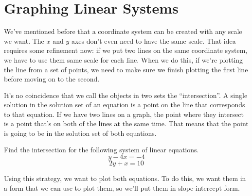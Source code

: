 
\section{Graphing Linear Systems}

We've mentioned before that a coordinate system can be created with any scale we want.  The $x$ and $y$ axes don't even need to have the same scale.  That idea requires some refinement now: if we put two lines on the same coordinate system, we have to use them same scale for each line.  When we do this, if we're plotting the line from a set of points, we need to make sure we finish plotting the first line before moving on to the second.


It's no coincidence that we call the objects in two sets the ``intersection''.  A single solution in the solution set of an equation is a point on the line that corresponds to that equation.  If we have two lines on a graph, the point where they intersect is a point that's on both of the lines at the same time.  That means that the point is going to be in the solution set of both equations.

\begin{example}
Find the intersection for the following system of linear equations.
$$y - 4x = -4$$
$$2y + x = 10$$

Using this strategy, we want to plot both equations.  To do this, we want them in a form that we can use to plot them, so we'll put them in slope-intercept form.

 

\end{example}